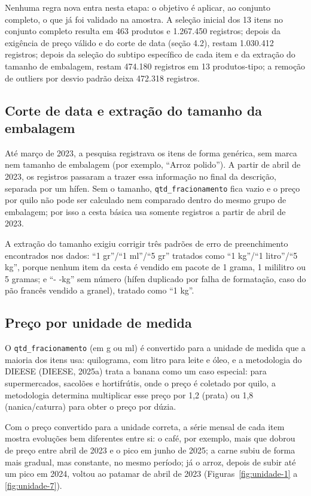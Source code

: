 \documentclass[11pt,a4paper]{article}
\newcommand{\col}[1]{\texttt{#1}}
\begin{document}
Nenhuma regra nova entra nesta etapa: o objetivo é aplicar, ao conjunto completo, o que já foi validado na amostra. A seleção inicial dos 13 itens no conjunto completo resulta em 463 produtos e 1.267.450 registros; depois da exigência de preço válido e do corte de data (seção 4.2), restam 1.030.412 registros; depois da seleção do subtipo específico de cada item e da extração do tamanho de embalagem, restam 474.180 registros em 13 produtos-tipo; a remoção de outliers por desvio padrão deixa 472.318 registros.

\subsection{Corte de data e extração do tamanho da embalagem}

Até março de 2023, a pesquisa registrava os itens de forma genérica, sem marca nem tamanho de embalagem (por exemplo, ``Arroz polido''). A partir de abril de 2023, os registros passaram a trazer essa informação no final da descrição, separada por um hífen. Sem o tamanho, \col{qtd\_fracionamento} fica vazio e o preço por quilo não pode ser calculado nem comparado dentro do mesmo grupo de embalagem; por isso a cesta básica usa somente registros a partir de abril de 2023.

A extração do tamanho exigiu corrigir três padrões de erro de preenchimento encontrados nos dados: ``1 gr''/``1 ml''/``5 gr'' tratados como ``1 kg''/``1 litro''/``5 kg'', porque nenhum item da cesta é vendido em pacote de 1 grama, 1 mililitro ou 5 gramas; e ``- -kg'' sem número (hífen duplicado por falha de formatação, caso do pão francês vendido a granel), tratado como ``1 kg''.

\subsection{Preço por unidade de medida}

O \col{qtd\_fracionamento} (em g ou ml) é convertido para a unidade de medida que a maioria dos itens usa: quilograma, com litro para leite e óleo, e a metodologia do DIEESE (DIEESE, 2025a) trata a banana como um caso especial: para supermercados, sacolões e hortifrútis, onde o preço é coletado por quilo, a metodologia determina multiplicar esse preço por 1,2 (prata) ou 1,8 (nanica/caturra) para obter o preço por dúzia.

Com o preço convertido para a unidade correta, a série mensal de cada item mostra evoluções bem diferentes entre si: o café, por exemplo, mais que dobrou de preço entre abril de 2023 e o pico em junho de 2025; a carne subiu de forma mais gradual, mas constante, no mesmo período; já o arroz, depois de subir até um pico em 2024, voltou ao patamar de abril de 2023 (Figuras~\ref{fig:unidade-1} a \ref{fig:unidade-7}).
\end{document}
